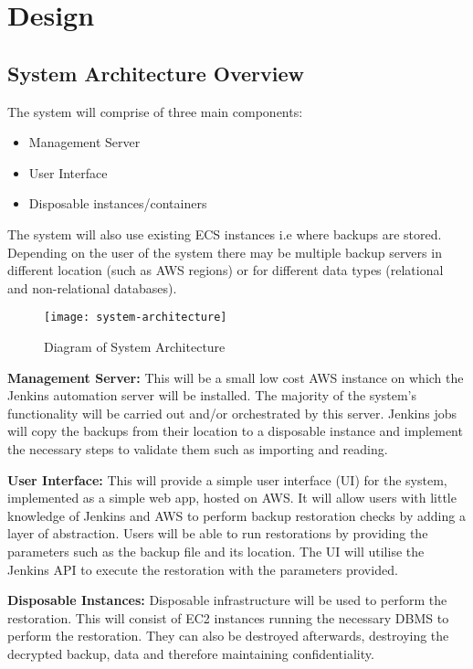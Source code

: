 \section{Design}
	\subsection{System Architecture Overview}
		The system will comprise of three main components:
		\begin{itemize}
			\item Management Server
			\item User Interface
			\item Disposable instances/containers
		\end{itemize}
		The system will also use existing ECS instances i.e  where backups are stored. Depending on the user of the system there may be multiple backup servers in different location (such as AWS regions) or for different data types (relational and non-relational databases).
		
		\begin{figure}[H]
			\setlength{\belowcaptionskip}{15pt plus 3pt minus 2pt}
			\caption{Diagram of System Architecture}
			\centering
			\texttt{[image: system-architecture]}
			\label{fig:diagram}
		\end{figure}
		
		\noindent \textbf{Management Server:} This will be a small low cost AWS instance on which the Jenkins automation server will be installed. The majority of the system's functionality will be carried out and/or orchestrated by this server. Jenkins jobs will copy the backups from their location to a disposable instance and implement the necessary steps to validate them such as importing and reading.
		
		\noindent \textbf{User Interface:} This will provide a simple user interface (UI) for the system, implemented as a simple web app, hosted on AWS. It will allow users with little knowledge of Jenkins and AWS to perform backup restoration checks by adding a layer of abstraction. Users will be able to run restorations by providing the parameters such as the backup file and its location. The UI will utilise the Jenkins API to execute the restoration with the parameters provided.
		
		\noindent\textbf{Disposable Instances:} Disposable infrastructure will be used to perform the restoration. This will consist of EC2 instances running the necessary DBMS to perform the restoration. They can also be destroyed afterwards, destroying the decrypted backup, data and therefore maintaining confidentiality.

